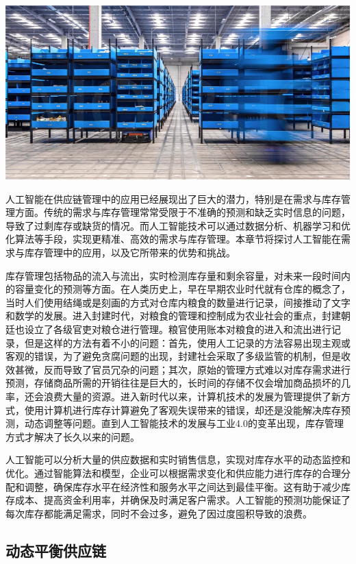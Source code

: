 \begin{marginfigure}
    \includegraphics{images/industry_8.png}
\end{marginfigure}

人工智能在供应链管理中的应用已经展现出了巨大的潜力，特别是在需求与库存管理方面。传统的需求与库存管理常常受限于不准确的预测和缺乏实时信息的问题，导致了过剩库存或缺货的情况。而人工智能技术可以通过数据分析、机器学习和优化算法等手段，实现更精准、高效的需求与库存管理。本章节将探讨人工智能在需求与库存管理中的应用，以及它所带来的优势和挑战。

库存管理包括物品的流入与流出，实时检测库存量和剩余容量，对未来一段时间内的容量变化的预测等方面。在人类历史上，早在早期农业时代就有仓库的概念了，当时人们使用结绳或是刻画的方式对仓库内粮食的数量进行记录，间接推动了文字和数学的发展。进入封建时代，对粮食的管理和控制成为农业社会的重点，封建朝廷也设立了各级官吏对粮仓进行管理。粮官使用账本对粮食的进入和流出进行记录，但是这样的方法有着不小的问题：首先，使用人工记录的方法容易出现主观或客观的错误，为了避免贪腐问题的出现，封建社会采取了多级监管的机制，但是收效甚微，反而导致了官员冗杂的问题；其次，原始的管理方式难以对库存需求进行预测，存储商品所需的开销往往是巨大的，长时间的存储不仅会增加商品损坏的几率，还会浪费大量的资源。进入新时代以来，计算机技术的发展为管理提供了新方式，使用计算机进行库存计算避免了客观失误带来的错误，却还是没能解决库存预测，动态调整等问题。直到人工智能技术的发展与工业4.0的变革出现，库存管理方式才解决了长久以来的问题。

人工智能可以分析大量的供应数据和实时销售信息，实现对库存水平的动态监控和优化。通过智能算法和模型，企业可以根据需求变化和供应能力进行库存的合理分配和调整，确保库存水平在经济性和服务水平之间达到最佳平衡。这有助于减少库存成本、提高资金利用率，并确保及时满足客户需求。人工智能的预测功能保证了每次库存都能满足需求，同时不会过多，避免了因过度囤积导致的浪费。

\subsection{动态平衡供应链}

